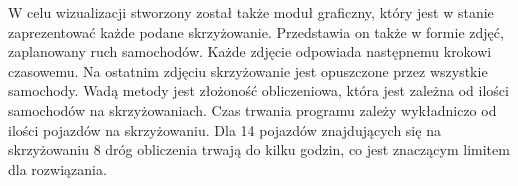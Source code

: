 \newline
\indent
W celu wizualizacji stworzony został także moduł graficzny, który jest w stanie zaprezentować każde podane skrzyżowanie. Przedstawia on także w formie zdjęć, zaplanowany ruch samochodów. Każde zdjęcie odpowiada następnemu krokowi czasowemu. Na ostatnim zdjęciu skrzyżowanie jest opuszczone przez wszystkie samochody.
\newline
\indent
Wadą metody jest złożoność obliczeniowa, która jest zależna od ilości samochodów na skrzyżowaniach. Czas trwania programu zależy wykładniczo od ilości pojazdów na skrzyżowaniu. Dla 14 pojazdów znajdujących się na skrzyżowaniu 8 dróg obliczenia trwają do kilku godzin, co jest znaczącym limitem dla rozwiązania.

